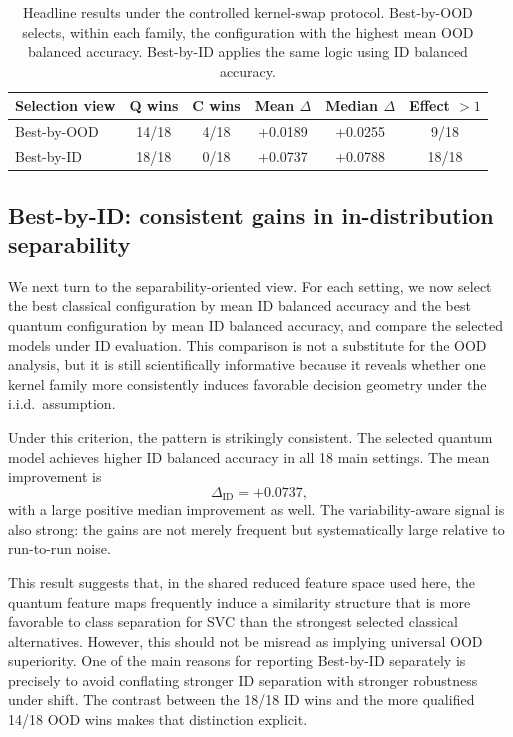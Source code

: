 \documentclass[pdflatex,sn-mathphys-num]{sn-jnl}%
\theoremstyle{thmstyleone}%
\theoremstyle{thmstyletwo}%
\theoremstyle{thmstylethree}%
\begin{document}
\begin{table}[t]
\centering
\caption{Headline results under the controlled kernel-swap protocol. Best-by-OOD selects, within each family, the configuration with the highest mean OOD balanced accuracy. Best-by-ID applies the same logic using ID balanced accuracy.}
\label{tab:headline_results}
\small
\begin{tabular}{lccccc}
\toprule
Selection view & Q wins & C wins & Mean $\Delta$ & Median $\Delta$ & Effect $>1$ \\
\midrule
Best-by-OOD & 14/18 & 4/18 & +0.0189 & +0.0255 & 9/18 \\
Best-by-ID  & 18/18 & 0/18 & +0.0737 & +0.0788 & 18/18 \\
\bottomrule
\end{tabular}
\end{table}

\subsection{Best-by-ID: consistent gains in in-distribution separability}

We next turn to the separability-oriented view. For each setting, we now select the best classical configuration by mean ID balanced accuracy and the best quantum configuration by mean ID balanced accuracy, and compare the selected models under ID evaluation. This comparison is not a substitute for the OOD analysis, but it is still scientifically informative because it reveals whether one kernel family more consistently induces favorable decision geometry under the i.i.d.\ assumption.

Under this criterion, the pattern is strikingly consistent. The selected quantum model achieves higher ID balanced accuracy in all 18 main settings. The mean improvement is
\[
\Delta_{\mathrm{ID}} = +0.0737,
\]
with a large positive median improvement as well. The variability-aware signal is also strong: the gains are not merely frequent but systematically large relative to run-to-run noise.

This result suggests that, in the shared reduced feature space used here, the quantum feature maps frequently induce a similarity structure that is more favorable to class separation for SVC than the strongest selected classical alternatives. However, this should not be misread as implying universal OOD superiority. One of the main reasons for reporting Best-by-ID separately is precisely to avoid conflating stronger ID separation with stronger robustness under shift. The contrast between the 18/18 ID wins and the more qualified 14/18 OOD wins makes that distinction explicit.
\end{document}
